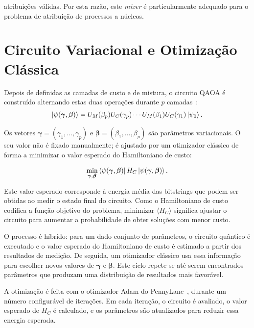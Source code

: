 atribuições válidas. Por esta razão, este \textit{mixer} é particularmente adequado para o
problema de atribuição de processos a núcleos.

\section{Circuito Variacional e Otimização Clássica}
\label{sec:circuito-variacional-otimizacao}

Depois de definidas as camadas de custo e de mistura, o circuito \acs{QAOA} é construído alternando estas duas operações durante $p$ camadas~\cite{Farhi2014QAOA}:
\begin{equation}
\ket{\psi(\boldsymbol{\gamma},\boldsymbol{\beta})}
=
U_M(\beta_p)U_C(\gamma_p)
\cdots
U_M(\beta_1)U_C(\gamma_1)
\ket{\psi_0}.
\end{equation}

Os vetores $\boldsymbol{\gamma}=(\gamma_1,\dots,\gamma_p)$ e
$\boldsymbol{\beta}=(\beta_1,\dots,\beta_p)$ são parâmetros variacionais. O seu
valor não é fixado manualmente; é ajustado por um otimizador clássico de forma a
minimizar o valor esperado do Hamiltoniano de custo:

\begin{equation}
    \min_{\boldsymbol{\gamma},\boldsymbol{\beta}}
    \bra{\psi(\boldsymbol{\gamma},\boldsymbol{\beta})}
    H_C
    \ket{\psi(\boldsymbol{\gamma},\boldsymbol{\beta})}.
\end{equation}

Este valor esperado corresponde à energia média das bitstrings que podem ser obtidas ao medir o estado final do circuito. Como o Hamiltoniano de custo codifica a função objetivo do problema, minimizar $\langle H_C \rangle$ significa ajustar o circuito para aumentar a probabilidade de obter soluções com menor custo.

O processo é híbrido: para um dado conjunto de parâmetros, o circuito quântico é executado e o valor esperado do Hamiltoniano de custo é estimado a partir dos resultados de medição. De seguida, um otimizador clássico usa essa informação para escolher novos valores de $\boldsymbol{\gamma}$ e $\boldsymbol{\beta}$. Este ciclo repete-se até serem encontrados parâmetros que produzam uma distribuição de resultados mais favorável.

A otimização é feita com o otimizador
Adam do PennyLane~\cite{Kingma2014Adam}, durante um número configurável de iterações. Em cada iteração,
o circuito é avaliado, o valor esperado de $H_C$ é calculado, e os parâmetros são
atualizados para reduzir essa energia esperada.


